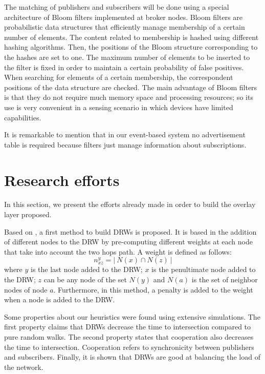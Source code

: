 \documentclass[conference]{IEEEtran}
\begin{document}
The matching of publishers and subscribers will be done using a special architecture of Bloom filters \cite{5751342} implemented at broker nodes. Bloom filters are probabilistic data structures that efficiently manage membership of a certain number of elements. The content related to membership is hashed using different hashing algorithms. Then, the positions of the Bloom structure corresponding to the hashes are set to one. The maximum number of elements to be inserted to the filter is fixed in order to maintain a certain probability of false positives. When searching for elements of a certain membership, the correspondent positions of the data structure are checked. The main advantage of Bloom filters is that they do not require much memory space and processing resources; so its use is very convenient in a sensing scenario in which devices have limited capabilities.

It is remarkable to mention that in our event-based system no advertisement table is required because filters just manage information about subscriptions.


\vspace{0.5em}
\section{Research efforts}
\label{sec:research}




In this section, we present the efforts already made in order to build the overlay layer proposed.

Based on \cite{ASCOMS13DRW}, a first method to build DRWs is proposed. It is based in the addition of different nodes to the DRW by pre-computing different weights at each node that take into account the two hops path. A weight is defined as follows:
\begin{equation}
\label{DRW Pierre}
n_{xz}^y = \vert \:  N(x)\cap N(z) \: \vert
\end{equation}
where $y$ is the last node added to the DRW; $x$ is the penultimate node added to the DRW; $z$ can be any node of the set $N(y)$ and $N(a)$ is the set of neighbor nodes of node $a$. Furthermore, in this method, a penalty is added to the weight when a node is added to the DRW.

Some properties about our heuristics were found using extensive simulations. The first property claims that DRWs decrease the time to intersection compared to pure random walks. The second property states that cooperation also decreases the time to intersection. Cooperation refers to synchronicity between publishers and subscribers. Finally, it is shown that DRWs are good at balancing the load of the network.
\end{document}
